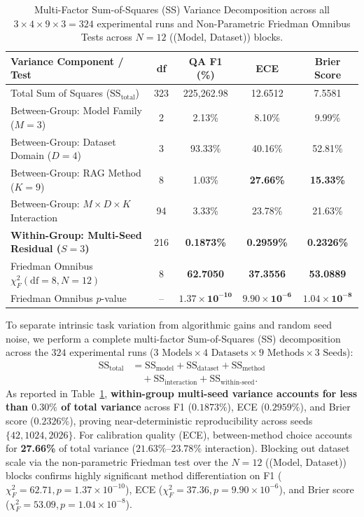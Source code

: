 \documentclass[11pt]{article}
\begin{document}
\begin{table}[t]
\centering
\small
\setlength{\tabcolsep}{8pt}
\caption{Multi-Factor Sum-of-Squares (SS) Variance Decomposition across all $3 \times 4 \times 9 \times 3 = 324$ experimental runs and Non-Parametric Friedman Omnibus Tests across $N=12$ ((Model, Dataset)) blocks.}
\label{tab:anova_friedman}
\begin{tabular}{lcccc}
\toprule
\textbf{Variance Component / Test} & \textbf{df} & \textbf{QA F1 (\%)} & \textbf{ECE} & \textbf{Brier Score} \\
\midrule
Total Sum of Squares ($\text{SS}_{\text{total}}$) & 323 & 225,262.98 & 12.6512 & 7.5581 \\
\midrule
Between-Group: Model Family ($M=3$) & 2 & 2.13\% & 8.10\% & 9.99\% \\
Between-Group: Dataset Domain ($D=4$) & 3 & 93.33\% & 40.16\% & 52.81\% \\
Between-Group: RAG Method ($K=9$) & 8 & 1.03\% & \textbf{27.66\%} & \textbf{15.33\%} \\
Between-Group: $M \times D \times K$ Interaction & 94 & 3.33\% & 23.78\% & 21.63\% \\
\textbf{Within-Group: Multi-Seed Residual ($S=3$)} & 216 & \textbf{0.1873\%} & \textbf{0.2959\%} & \textbf{0.2326\%} \\
\midrule
Friedman Omnibus $\chi_F^2(\text{df}=8, N=12)$ & 8 & \textbf{62.7050} & \textbf{37.3556} & \textbf{53.0889} \\
Friedman Omnibus $p$-value & -- & $\mathbf{1.37 \times 10^{-10}}$ & $\mathbf{9.90 \times 10^{-6}}$ & $\mathbf{1.04 \times 10^{-8}}$ \\
\bottomrule
\end{tabular}
\end{table}

To separate intrinsic task variation from algorithmic gains and random seed noise, we perform a complete multi-factor Sum-of-Squares (SS) decomposition across the $324$ experimental runs ($3\text{ Models} \times 4\text{ Datasets} \times 9\text{ Methods} \times 3\text{ Seeds}$):
\begin{align}
\text{SS}_{\text{total}} &= \text{SS}_{\text{model}} + \text{SS}_{\text{dataset}} + \text{SS}_{\text{method}} \nonumber \\
&\quad + \text{SS}_{\text{interaction}} + \text{SS}_{\text{within-seed}}.
\label{eq:ss_decomp}
\end{align}
As reported in Table~\ref{tab:anova_friedman}, \textbf{within-group multi-seed variance accounts for less than $0.30\%$ of total variance} across F1 ($0.1873\%$), ECE ($0.2959\%$), and Brier score ($0.2326\%$), proving near-deterministic reproducibility across seeds $\{42, 1024, 2026\}$. For calibration quality (ECE), between-method choice accounts for \textbf{27.66\%} of total variance ($21.63\%\text{--}23.78\%$ interaction). Blocking out dataset scale via the non-parametric Friedman test over the $N=12$ ((Model, Dataset)) blocks confirms highly significant method differentiation on F1 ($\chi_F^2 = 62.71, p = 1.37 \times 10^{-10}$), ECE ($\chi_F^2 = 37.36, p = 9.90 \times 10^{-6}$), and Brier score ($\chi_F^2 = 53.09, p = 1.04 \times 10^{-8}$).
\end{document}
